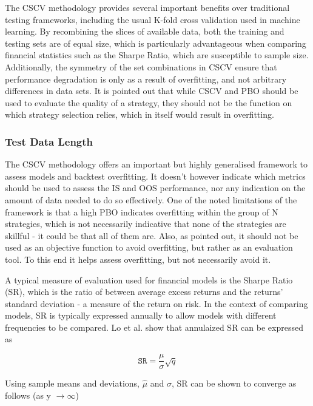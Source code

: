 \documentclass[a4paper,11pt,oneside]{article}
\theoremstyle{plain}
\theoremstyle{definition}
\begin{document}
The CSCV methodology provides several important benefits over traditional testing 
frameworks, including the usual K-fold cross validation used in machine learning. By recombining the slices of 
available data, both the training and testing sets are of equal size, which is particularly advantageous when comparing 
financial statistics such as the Sharpe Ratio, which are susceptible to sample size. Additionally, the symmetry 
of the set combinations in CSCV ensure that performance degradation is only as a result of overfitting, and not 
arbitrary differences in data sets. It is pointed out that while CSCV and PBO should be used to evaluate the quality 
of a strategy, they should not be the function on which strategy selection relies, which in itself would result in overfitting.
\hfill \break 

\subsubsection{Test Data Length}

The CSCV methodology offers an important but highly generalised framework to assess models and backtest 
overfitting. It doesn’t however indicate which metrics should be used to assess the IS and OOS performance, nor 
any indication on the amount of data needed to do so effectively. One of the noted limitations of the framework is 
that a high PBO indicates overfitting within the group of N strategies, which is not necessarily indicative that none 
of the strategies are skillful - it could be that all of them are. Also, as pointed out, it should not be used as an 
objective function to avoid overfitting, but rather as an evaluation tool. To this end it helps assess overfitting, but 
not necessarily avoid it. 
\hfill \break 

A typical measure of evaluation used for financial models is the Sharpe Ratio (SR), which is the ratio of between 
average excess returns and the returns’ standard deviation - a measure of the return on risk. In the context of 
comparing models, SR is typically expressed annually to allow models with different frequencies to be compared. 
Lo et al. \cite{Lo} show that annulaized SR can be expressed as

\begin{equation}\label{SRAnnual}
\texttt{SR}=\frac{\mu}{\sigma}\sqrt{q}
\end{equation}

Using sample means and deviations, $\hat{\mu}$ and $\hat{\sigma}$, SR can be shown to converge as follows 
(as y $\rightarrow\infty$)
\end{document}
